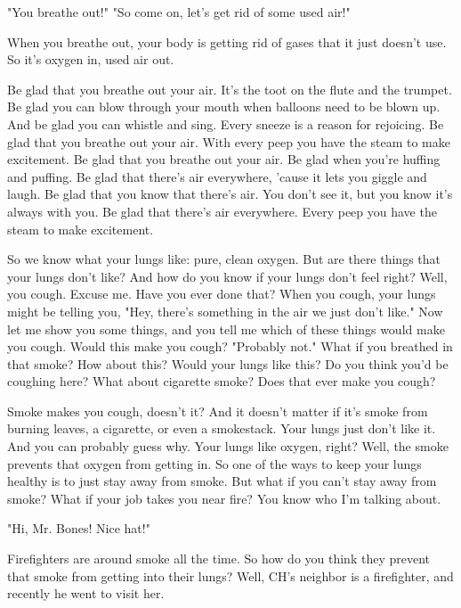 "You breathe out!"
"So come on, let's get rid of some used air!"

When you breathe out, your body is getting rid of gases that it just doesn't use. So it's oxygen in, used air out.

Be glad that you breathe out your air. It's the toot on the flute and the trumpet. Be glad you can blow through your mouth when balloons need to be blown up. And be glad you can whistle and sing. Every sneeze is a reason for rejoicing. Be glad that you breathe out your air. With every peep you have the steam to make excitement. Be glad that you breathe out your air. Be glad when you're huffing and puffing. Be glad that there's air everywhere, 'cause it lets you giggle and laugh. Be glad that you know that there's air. You don't see it, but you know it's always with you. Be glad that there's air everywhere. Every peep you have the steam to make excitement.

So we know what your lungs like: pure, clean oxygen. But are there things that your lungs don't like? And how do you know if your lungs don't feel right? Well, you cough. Excuse me. Have you ever done that? When you cough, your lungs might be telling you, "Hey, there's something in the air we just don't like." Now let me show you some things, and you tell me which of these things would make you cough. Would this make you cough?
"Probably not."
What if you breathed in that smoke? How about this? Would your lungs like this? Do you think you'd be coughing here? What about cigarette smoke? Does that ever make you cough?

Smoke makes you cough, doesn't it? And it doesn't matter if it's smoke from burning leaves, a cigarette, or even a smokestack. Your lungs just don't like it. And you can probably guess why. Your lungs like oxygen, right? Well, the smoke prevents that oxygen from getting in. So one of the ways to keep your lungs healthy is to just stay away from smoke. But what if you can't stay away from smoke? What if your job takes you near fire? You know who I'm talking about.

"Hi, Mr. Bones! Nice hat!"

Firefighters are around smoke all the time. So how do you think they prevent that smoke from getting into their lungs? Well, CH's neighbor is a firefighter, and recently he went to visit her.

